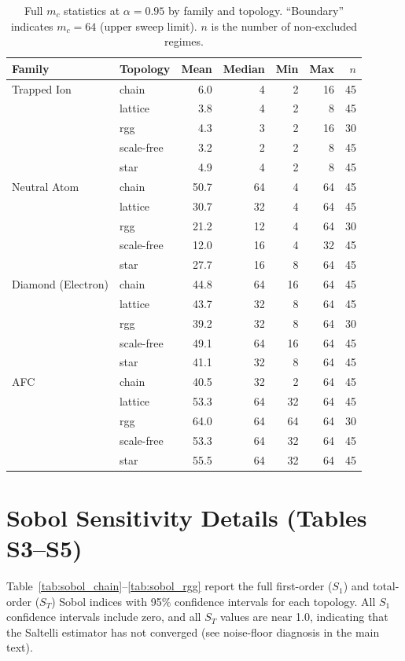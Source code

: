 \documentclass[aps,prapplied,reprint,superscriptaddress]{revtex4-2}
\begin{document}
\begin{table}[htbp]
\centering
\caption{Full $m_c$ statistics at $\alpha = 0.95$ by family and topology. ``Boundary'' indicates $m_c = 64$ (upper sweep limit). $n$ is the number of non-excluded regimes.}
\label{tab:mc_full}
\begin{tabular}{llrrrrr}
\toprule
Family & Topology & Mean & Median & Min & Max & $n$ \\
\midrule
Trapped Ion & chain & 6.0 & 4 & 2 & 16 & 45 \\
 & lattice & 3.8 & 4 & 2 & 8 & 45 \\
 & rgg & 4.3 & 3 & 2 & 16 & 30 \\
 & scale-free & 3.2 & 2 & 2 & 8 & 45 \\
 & star & 4.9 & 4 & 2 & 8 & 45 \\
\midrule
Neutral Atom & chain & 50.7 & 64 & 4 & 64 & 45 \\
 & lattice & 30.7 & 32 & 4 & 64 & 45 \\
 & rgg & 21.2 & 12 & 4 & 64 & 30 \\
 & scale-free & 12.0 & 16 & 4 & 32 & 45 \\
 & star & 27.7 & 16 & 8 & 64 & 45 \\
\midrule
Diamond (Electron) & chain & 44.8 & 64 & 16 & 64 & 45 \\
 & lattice & 43.7 & 32 & 8 & 64 & 45 \\
 & rgg & 39.2 & 32 & 8 & 64 & 30 \\
 & scale-free & 49.1 & 64 & 16 & 64 & 45 \\
 & star & 41.1 & 32 & 8 & 64 & 45 \\
\midrule
AFC & chain & 40.5 & 32 & 2 & 64 & 45 \\
 & lattice & 53.3 & 64 & 32 & 64 & 45 \\
 & rgg & 64.0 & 64 & 64 & 64 & 30 \\
 & scale-free & 53.3 & 64 & 32 & 64 & 45 \\
 & star & 55.5 & 64 & 32 & 64 & 45 \\
\bottomrule
\end{tabular}
\end{table}

\section{Sobol Sensitivity Details (Tables S3--S5)}

Table~\ref{tab:sobol_chain}--\ref{tab:sobol_rgg} report the full first-order ($S_1$) and total-order ($S_T$) Sobol indices with 95\% confidence intervals for each topology. All $S_1$ confidence intervals include zero, and all $S_T$ values are near 1.0, indicating that the Saltelli estimator has not converged (see noise-floor diagnosis in the main text).
\end{document}

